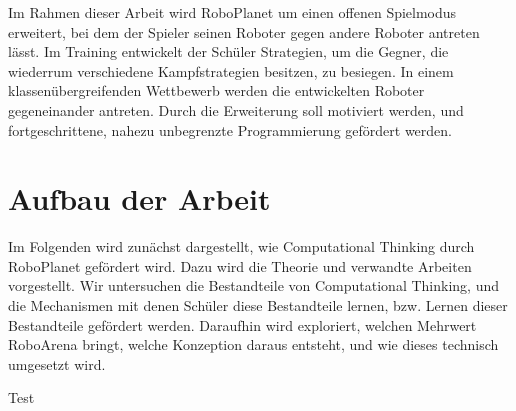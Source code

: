 Im Rahmen dieser Arbeit wird RoboPlanet um einen offenen Spielmodus erweitert, bei dem der Spieler
seinen Roboter gegen andere Roboter antreten lässt. Im Training entwickelt der Schüler Strategien,
um die Gegner, die wiederrum verschiedene Kampfstrategien besitzen, zu besiegen. In einem
klassenübergreifenden Wettbewerb werden die entwickelten Roboter gegeneinander antreten. Durch die
Erweiterung soll motiviert werden, und fortgeschrittene, nahezu unbegrenzte Programmierung gefördert
werden.


\section{Aufbau der Arbeit}

Im Folgenden wird zunächst dargestellt, wie Computational Thinking durch RoboPlanet gefördert wird.
Dazu wird die Theorie und verwandte Arbeiten vorgestellt. Wir untersuchen die Bestandteile von
Computational Thinking, und die Mechanismen mit denen Schüler diese Bestandteile lernen, bzw. Lernen
dieser Bestandteile gefördert werden. Daraufhin wird exploriert, welchen Mehrwert RoboArena bringt,
welche Konzeption daraus entsteht, und wie dieses technisch umgesetzt wird.

Test \cite{Ikeda1997}

